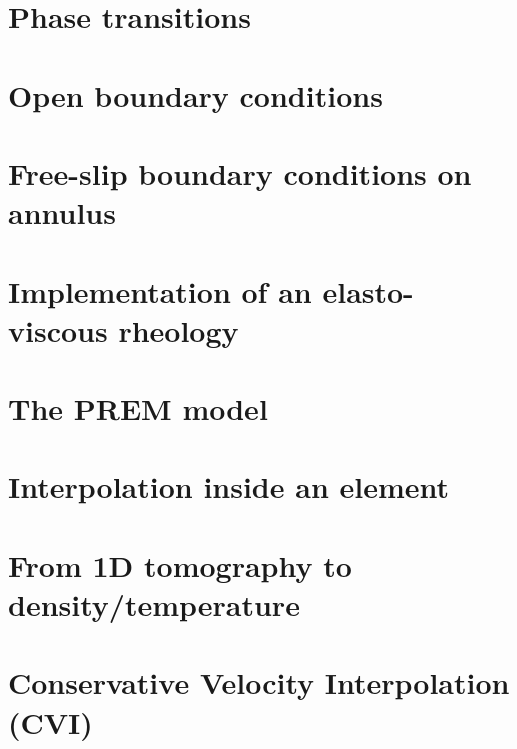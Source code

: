 \section{Phase transitions}\label{ss:phasetransitions} %
\newpage %
\section{Open boundary conditions}\label{ss:openbc} %
\newpage %
\section{Free-slip boundary conditions on annulus}\label{ss:fsbc_annulus} %
\newpage %
\section{Implementation of an elasto-viscous rheology} \label{ss:evrheo}  %
\newpage %
\section{The PREM model} \label{ss:prem}  %
\newpage %
\section{Interpolation inside an element} \label{ss:bern}  %
\newpage %
\section{From 1D tomography to density/temperature}  %
\newpage %
\section{Conservative Velocity Interpolation (CVI)} \label{sec:cvi} %
\newpage %
